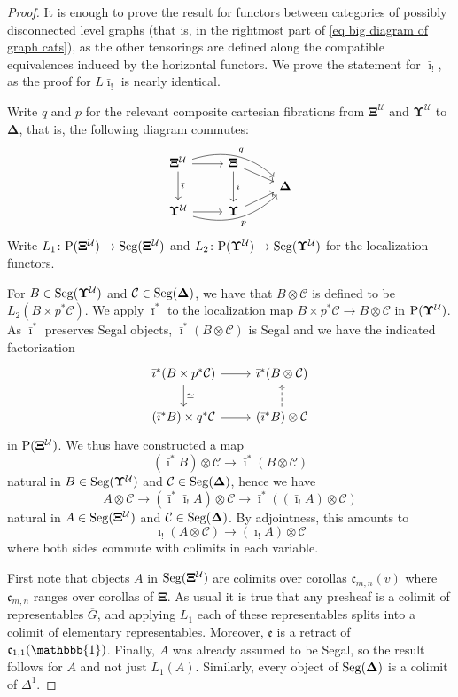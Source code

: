 \documentclass{amsart}
\numberwithin{theorem}{subsection}
\theoremstyle{definition}
\newcommand{\bbone}{\mathbbb{1}}
\newcommand{\xcc}{\mathcal{C}}
\newcommand{\xU}{\mathcal{U}}
\newcommand{\xfe}{\mathfrak{e}}
\newcommand{\xfc}{\mathfrak{c}}
\newcommand{\Pre}{\name{P}}
\newcommand{\name}[1]{\ensuremath{\text{\textup{#1}}}}
\newcommand{\simp}{\mathbf{\Delta}}
\newcommand{\gc}{\mathbf{\Xi}}
\newcommand{\gcone}{\gc}
\newcommand{\gctwo}{\mathbf{\Upsilon}}
\newcommand{\gcUone}{\gcone^\xU}
\newcommand{\gcUtwo}{\gctwo^\xU}
\newcommand{\barishriek}{\bar \imath_!}
\newcommand{\bariustar}{\bar \imath^*}
\newcommand{\Seg}{\name{Seg}}
\begin{document}
\begin{proof}
It is enough to prove the result for functors between categories of possibly disconnected level graphs (that is, in the rightmost part of \eqref{eq big diagram of graph cats}), as the other tensorings are defined along the compatible equivalences induced by the horizontal functors.
We prove the statement for $\barishriek$, as the proof for $L\barishriek$ is nearly identical.

Write $q$ and $p$ for the relevant composite cartesian fibrations from $\gcUone$ and $\gcUtwo$ to $\simp$, that is, the following diagram commutes:
\[ \begin{tikzcd}[row sep=tiny]
\gcUone \arrow[dd,"\bar \imath"] \rar \arrow[rrd,bend left, "q"] & \gcone \arrow[dd,"i"] \arrow[dr] \\
& & \simp\\
\gcUtwo \rar \arrow[rru, bend right, "p"'] & \gctwo \arrow[ur] 
\end{tikzcd} \]
Write $L_1 \colon \Pre(\gcUone) \to \Seg(\gcUone)$ and $L_2 \colon \Pre(\gcUtwo) \to \Seg(\gcUtwo)$ for the localization functors.

For $B\in \Seg(\gcUtwo)$ and $\xcc \in \Seg(\simp)$, we have that $B\otimes \xcc$ is defined to be $L_2(B \times p^*\xcc)$.
We apply $\bariustar$ to the localization map $B \times p^*\xcc \to B\otimes \xcc$ in $\Pre(\gcUtwo)$.
As $\bariustar$ preserves Segal objects, $\bariustar(B\otimes \xcc)$ is Segal and we have the indicated factorization
\[ \begin{tikzcd}
\bariustar(B \times p^*\xcc) \dar{\simeq} \rar & 
	\bariustar (B\otimes \xcc)  \\
(\bariustar B) \times q^*\xcc \rar & (\bariustar B)\otimes \xcc \uar[dashed]
\end{tikzcd} \]
in $\Pre(\gcUone)$.
We thus have constructed a map 
\[
	(\bariustar B)\otimes \xcc \to \bariustar (B\otimes \xcc)
\]
natural in $B\in \Seg(\gcUtwo)$ and $\xcc \in \Seg(\simp)$, hence we have
\[
	A \otimes \xcc \to (\bariustar \barishriek A)\otimes \xcc \to \bariustar ((\barishriek A)\otimes \xcc)
\]
natural in $A \in \Seg(\gcUone)$ and $\xcc \in \Seg(\simp)$.
By adjointness, this amounts to 
\begin{equation}\label{eq desired map}
	\barishriek(A \otimes \xcc) \to (\barishriek A)\otimes \xcc
\end{equation}
where both sides commute with colimits in each variable.

First note that objects $A$ in $\Seg(\gcUone)$ are colimits over corollas $\xfc_{m,n}(v)$ where $\xfc_{m,n}$ ranges over corollas of $\gcone$.
As usual it is true that any presheaf is a colimit of representables $\overline{G}$, and applying $L_1$ each of these representables splits into a colimit of elementary representables.
Moreover, $\xfe$ is a retract of $\xfc_{1,1}(\bbone)$.
Finally, $A$ was already assumed to be Segal, so the result follows for $A$ and not just $L_1(A)$.
Similarly, every object of $\Seg(\simp)$ is a colimit of $\Delta^1$.


\end{proof}
\end{document}
